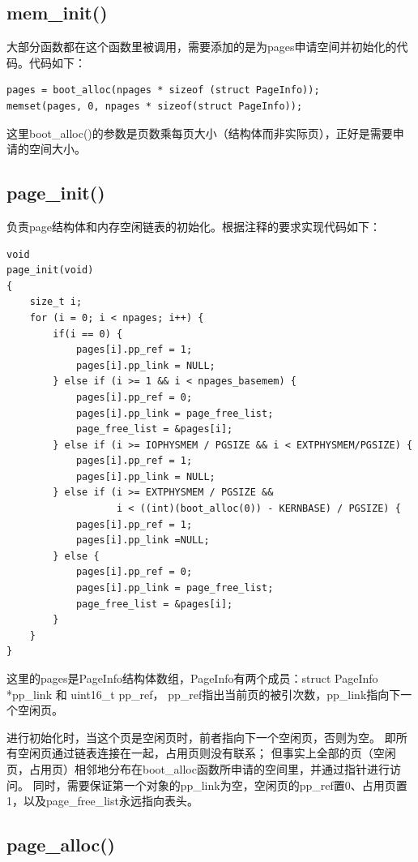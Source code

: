 \documentclass[12pt,a4paper,UTF8]{article}
\begin{document}
    \subsection{mem\_init()}

    大部分函数都在这个函数里被调用，需要添加的是为pages申请空间并初始化的代码。代码如下：

    \begin{lstlisting}[style=CPP]
pages = boot_alloc(npages * sizeof (struct PageInfo));
memset(pages, 0, npages * sizeof(struct PageInfo));
    \end{lstlisting}

    这里boot\_alloc()的参数是页数乘每页大小（结构体而非实际页），正好是需要申请的空间大小。

    \subsection{page\_init()}
    负责page结构体和内存空闲链表的初始化。根据注释的要求实现代码如下：

    \begin{lstlisting}[style=CPP]
void
page_init(void)
{
	size_t i;
	for (i = 0; i < npages; i++) {
		if(i == 0) {	
            pages[i].pp_ref = 1;
			pages[i].pp_link = NULL;
		} else if (i >= 1 && i < npages_basemem) {
			pages[i].pp_ref = 0;
			pages[i].pp_link = page_free_list; 
			page_free_list = &pages[i];
		} else if (i >= IOPHYSMEM / PGSIZE && i < EXTPHYSMEM/PGSIZE) {
			pages[i].pp_ref = 1;
			pages[i].pp_link = NULL;
        } else if (i >= EXTPHYSMEM / PGSIZE && 
                   i < ((int)(boot_alloc(0)) - KERNBASE) / PGSIZE) {
			pages[i].pp_ref = 1;
			pages[i].pp_link =NULL;
		} else {
			pages[i].pp_ref = 0;
			pages[i].pp_link = page_free_list;
			page_free_list = &pages[i];
		}
	}
}
    \end{lstlisting}

    这里的pages是PageInfo结构体数组，PageInfo有两个成员：struct PageInfo *pp\_link 和 uint16\_t pp\_ref，
    pp\_ref指出当前页的被引次数，pp\_link指向下一个空闲页。


    进行初始化时，当这个页是空闲页时，前者指向下一个空闲页，否则为空。
    即所有空闲页通过链表连接在一起，占用页则没有联系；
    但事实上全部的页（空闲页，占用页）相邻地分布在boot\_alloc函数所申请的空间里，并通过指针进行访问。
    同时，需要保证第一个对象的pp\_link为空，空闲页的pp\_ref置0、占用页置1，以及page\_free\_list永远指向表头。

    \subsection{page\_alloc()}
\end{document}
